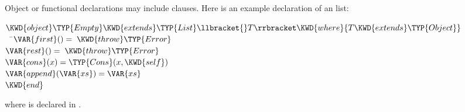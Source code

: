 Object or functional declarations may include  clauses.
Here is an example declaration of an  list:
\begin{Fortress}
\(\KWD{object} \TYP{Empty} \KWD{extends} \TYP{List}\llbracket{}T\rrbracket \KWD{where} \{T \KWD{extends} \TYP{Object}\}\)\\
{\tt~~}\pushtabs\=\+\(  \VAR{first}() = \;\KWD{throw} \TYP{Error}\)\\
\(  \VAR{rest}() = \;\KWD{throw} \TYP{Error}\)\\
\(  \VAR{cons}(x) = \TYP{Cons}(x,\KWD{self})\)\\
\(  \VAR{append}(\VAR{xs}) = \VAR{xs}\)\-\\\poptabs
\(\KWD{end}\)
\end{Fortress}
where  is declared in .

